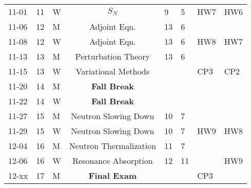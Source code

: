 \documentclass[11pt, a4paper]{article}
\begin{document}
\begin{table}[h]
\begin{center}
\begin{tabular}{lllcllll}
11-01 & 11 & W & $S_N$          & 9 & 5 & HW7 & HW6 \\
11-06 & 12 & M & Adjoint Eqn.   & 13 & 6 &  & \\
11-08 & 12 & W & Adjoint Eqn.   & 13 & 6 & HW8 & HW7\\
11-13 & 13 & M & Perturbation Theory & 13 & 6 & & \\
11-15 & 13 & W & Variational Methods &  &  & CP3 & CP2\\
11-20 & 14 & M & \textbf{Fall Break} & & &  & \\
11-22 & 14 & W & \textbf{Fall Break} &  &  &  & \\
11-27 & 15 & M & Neutron Slowing Down & 10 & 7 &  & \\
11-29 & 15 & W & Neutron Slowing Down & 10 & 7 & HW9 & HW8 \\
12-04 & 16 & M & Neutron Thermalization &  11 & 7 &  & \\
12-06 & 16 & W & Resonance Absorption & 12 & 11 &  & HW9\\
12-xx & 17 & M & \textbf{Final Exam} &  &  & CP3 & \\
\end{tabular}
\end{center}
\end{table}
\end{document}
